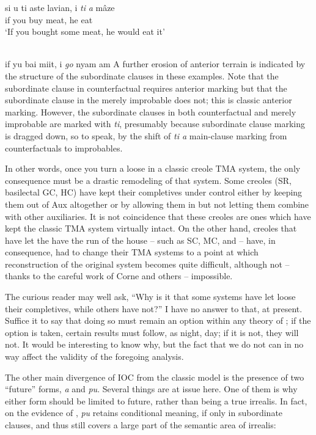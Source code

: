 \ea\label{ex:2:116}
\gll si u ti aste lavian, i \emph{ti} \emph{a} mâze\\
if you {\TNS} buy meat, he {\TNS} {\MOD} eat\\
\glt `If you bought some meat, he would eat it'
\z

\ea\label{ex:2:117}
\langinfo{\langGC}{}{}\\
if yu bai miit, i \textit{go} nyam am
\z
A further erosion of anterior terrain is indicated by the structure of the subordinate clauses in these examples. Note that the subordinate clause in counterfactual  requires anterior marking but that the subordinate clause in the merely improbable  does not; this is classic anterior marking. However, the subordinate clauses in both counterfactual  and merely improbable  are marked with \textit{ti}, presumably because subordinate clause marking is dragged down, so to speak, by the shift of \textit{ti a} main-clause marking from counterfactuals to improbables.

In other words, once you turn a  loose in a classic creole TMA system, the only consequence must be a drastic remodeling of that system. Some creoles (SR, basilectal GC, HC) have kept their completives under control either by keeping them out of Aux al\-together or by allowing them in but not letting them combine with other auxiliaries. It is not coincidence that these creoles are ones which have kept the classic TMA system virtually intact. On the other hand, creoles that have let the  have the run of the house -- such as SC, MC, and  -- have, in consequence, had to change their TMA systems to a point at which reconstruction of the original system becomes quite difficult, although not -- thanks to the careful work of Corne and others -- impossible.

The curious reader may well ask, ``Why is it that some systems have let loose their completives, while others have not?'' I have no answer to that, at present. Suffice it to say that doing so must remain an option within any theory of ; if the option is taken, certain results must follow, as night, day; if it is not, they will not. It would be interesting to know why, but the fact that we do not can in no way affect the validity of the foregoing analysis.


The other main divergence of IOC from the classic model is the presence of two ``future'' forms, \textit{a} and \textit{pu}. Several things are at issue here. One of them is why either form should be limited to future, rather than being a true irrealis. In fact, on the evidence of \citet[103]{Corne1977}, \textit{pu} retains conditional meaning, if only in subordinate clauses, and thus still covers a large part of the semantic area of ir\-realis:

